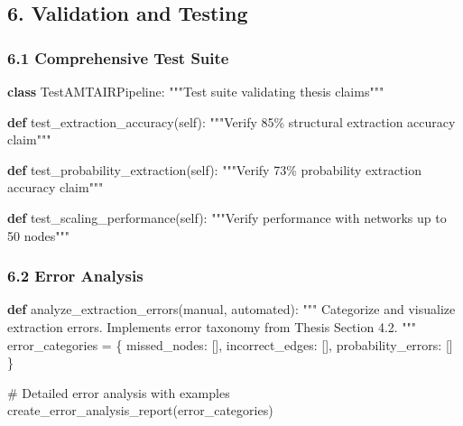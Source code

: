 \documentclass[
  11pt,
  letterpaper,
]{book}
\newenvironment{Shaded}{\begin{snugshade}}{\end{snugshade}}
\newcommand{\CommentTok}[1]{\textcolor[rgb]{0.37,0.37,0.37}{#1}}
\newcommand{\KeywordTok}[1]{\textcolor[rgb]{0.00,0.23,0.31}{\textbf{#1}}}
\newcommand{\NormalTok}[1]{\textcolor[rgb]{0.00,0.23,0.31}{#1}}
\newcommand{\OperatorTok}[1]{\textcolor[rgb]{0.37,0.37,0.37}{#1}}
\newcommand{\StringTok}[1]{\textcolor[rgb]{0.13,0.47,0.30}{#1}}
\newcommand{\VariableTok}[1]{\textcolor[rgb]{0.07,0.07,0.07}{#1}}
\begin{document}
\subsection{6. Validation and Testing}\label{validation-and-testing}

\subsubsection{6.1 Comprehensive Test
Suite}\label{comprehensive-test-suite-1}

\begin{Shaded}
\begin{Highlighting}[]
\KeywordTok{class}\NormalTok{ TestAMTAIRPipeline:}
    \CommentTok{"""Test suite validating thesis claims"""}
    
    \KeywordTok{def}\NormalTok{ test\_extraction\_accuracy(}\VariableTok{self}\NormalTok{):}
        \CommentTok{"""Verify 85\% structural extraction accuracy claim"""}
        
    \KeywordTok{def}\NormalTok{ test\_probability\_extraction(}\VariableTok{self}\NormalTok{):}
        \CommentTok{"""Verify 73\% probability extraction accuracy claim"""}
        
    \KeywordTok{def}\NormalTok{ test\_scaling\_performance(}\VariableTok{self}\NormalTok{):}
        \CommentTok{"""Verify performance with networks up to 50 nodes"""}
\end{Highlighting}
\end{Shaded}

\subsubsection{6.2 Error Analysis}\label{error-analysis}

\begin{Shaded}
\begin{Highlighting}[]
\KeywordTok{def}\NormalTok{ analyze\_extraction\_errors(manual, automated):}
    \CommentTok{"""}
\CommentTok{    Categorize and visualize extraction errors.}
\CommentTok{    Implements error taxonomy from Thesis Section 4.2.}
\CommentTok{    """}
\NormalTok{    error\_categories }\OperatorTok{=}\NormalTok{ \{}
        \StringTok{\textquotesingle{}missed\_nodes\textquotesingle{}}\NormalTok{: [],}
        \StringTok{\textquotesingle{}incorrect\_edges\textquotesingle{}}\NormalTok{: [],}
        \StringTok{\textquotesingle{}probability\_errors\textquotesingle{}}\NormalTok{: []}
\NormalTok{    \}}
    
    \CommentTok{\# Detailed error analysis with examples}
\NormalTok{    create\_error\_analysis\_report(error\_categories)}
\end{Highlighting}
\end{Shaded}
\end{document}
